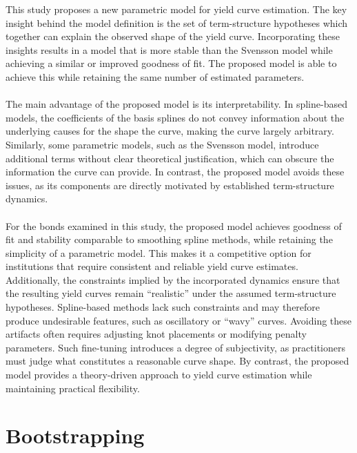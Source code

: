 \documentclass[a4paper]{artikel3}
\numberwithin{equation}{section}
\numberwithin{theorem}{section}
\numberwithin{proposition}{section}
\numberwithin{lemma}{section}
\begin{document}
This study proposes a new parametric model for yield curve estimation. The key insight behind the model definition is the set of term-structure hypotheses which together can explain the observed shape of the yield curve. Incorporating these insights results in a model that is more stable than the Svensson model while achieving a similar or improved goodness of fit. The proposed model is able to achieve this while retaining the same number of estimated parameters. \\
\\
The main advantage of the proposed model is its interpretability. In spline-based models, the coefficients of the basis splines do not convey information about the underlying causes for the shape the curve, making the curve largely arbitrary. Similarly, some parametric models, such as the Svensson model, introduce additional terms without clear theoretical justification, which can obscure the information the curve can provide. In contrast, the proposed model avoids these issues, as its components are directly motivated by established term-structure dynamics. \\
\\
For the bonds examined in this study, the proposed model achieves goodness of fit and stability comparable to smoothing spline methods, while retaining the simplicity of a parametric model. This makes it a competitive option for institutions that require consistent and reliable yield curve estimates. Additionally, the constraints implied by the incorporated dynamics ensure that the resulting yield curves remain ``realistic'' under the assumed term-structure hypotheses. Spline-based methods lack such constraints and may therefore produce undesirable features, such as oscillatory or “wavy” curves. Avoiding these artifacts often requires adjusting knot placements or modifying penalty parameters. Such fine-tuning introduces a degree of subjectivity, as practitioners must judge what constitutes a reasonable curve shape. By contrast, the proposed model provides a theory-driven approach to yield curve estimation while maintaining practical flexibility.


\clearpage






\clearpage


\appendix


\section{Bootstrapping}
\label{app:bootstrap}
\end{document}
